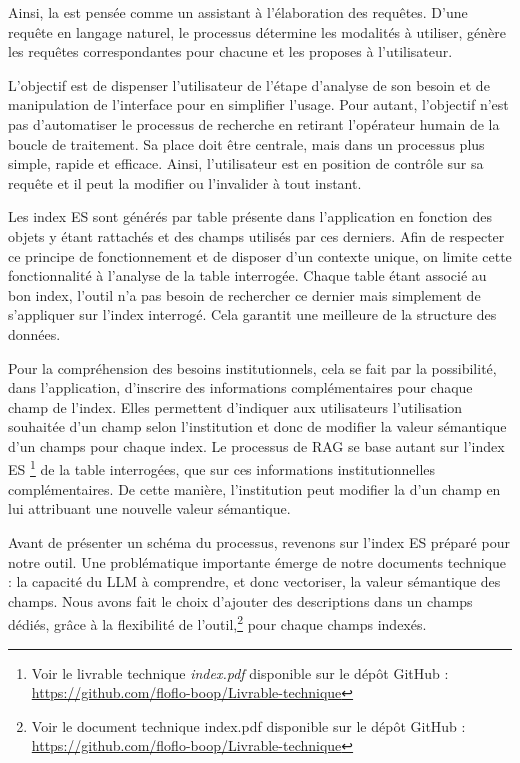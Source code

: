 Ainsi, la  est pensée comme un assistant à l'élaboration des requêtes. D'une requête en langage naturel, le processus détermine les modalités à utiliser, génère les requêtes correspondantes pour chacune et les proposes à l'utilisateur.

L'objectif est de dispenser l'utilisateur de l'étape d'analyse de son besoin et de manipulation de l'interface pour en simplifier l'usage. Pour autant, l'objectif n'est pas d'automatiser le processus de recherche en retirant l'opérateur humain de la boucle de traitement. Sa place doit être centrale, mais dans un processus plus simple, rapide et efficace. Ainsi, l'utilisateur est en position de contrôle sur sa requête et il peut la modifier ou l'invalider à tout instant. 

Les index \gls{ES} sont générés par \gls{table} présente dans l'application en fonction des objets y étant rattachés et des champs utilisés par ces derniers. Afin de respecter ce principe de fonctionnement et de disposer d'un contexte unique, on limite cette fonctionnalité à l'analyse de la table interrogée. Chaque \gls{table} étant associé au bon index, l'outil n'a pas besoin de rechercher ce dernier mais simplement de s'appliquer sur l'index interrogé. Cela garantit une meilleure  de la structure des données. 

Pour la compréhension des besoins institutionnels, cela se fait par la possibilité, dans l'application, d'inscrire des informations complémentaires pour chaque champ de l'index. Elles permettent d'indiquer aux utilisateurs l'utilisation souhaitée d'un champ selon l'institution et donc de modifier la valeur sémantique d'un champs pour chaque index. Le processus de \gls{RAG} se base autant sur l'index \gls{ES} \footnote{Voir le livrable technique \textit{index.pdf} disponible sur le dépôt GitHub : \url{https://github.com/floflo-boop/Livrable-technique}} de la \gls{table} interrogées, que sur ces informations institutionnelles complémentaires. De cette manière, l'institution peut modifier la  d'un champ en lui attribuant une nouvelle valeur sémantique. \newline

Avant de présenter un schéma du processus, revenons sur l'index \gls{ES} préparé pour notre outil. Une problématique importante émerge de notre documents technique : la capacité du \gls{LLM} à comprendre, et donc vectoriser, la valeur sémantique des champs. Nous avons fait le choix d'ajouter des descriptions dans un champs dédiés, grâce à la flexibilité de l'outil,\footnote{Voir le document technique {index.pdf} disponible sur le dépôt GitHub : \url{https://github.com/floflo-boop/Livrable-technique}} pour chaque champs indexés. 

